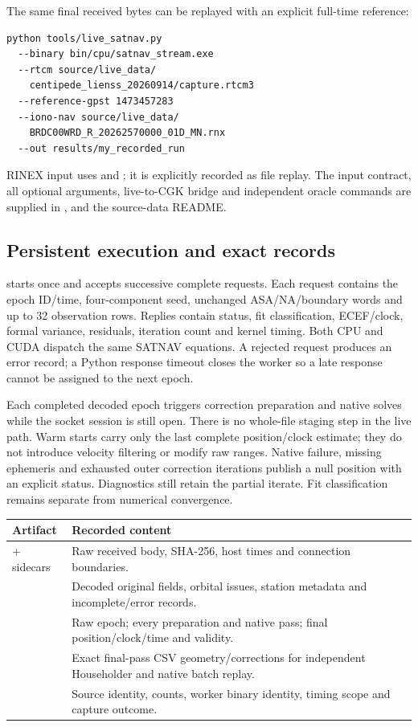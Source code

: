 The same final received bytes can be replayed with an explicit full-time reference:
\begin{lstlisting}
python tools/live_satnav.py
  --binary bin/cpu/satnav_stream.exe
  --rtcm source/live_data/
    centipede_lienss_20260914/capture.rtcm3
  --reference-gpst 1473457283
  --iono-nav source/live_data/
    BRDC00WRD_R_20262570000_01D_MN.rnx
  --out results/my_recorded_run
\end{lstlisting}
RINEX input uses  and ; it is explicitly recorded
as file replay. The input contract, all optional arguments, live-to-CGK bridge
and independent oracle commands are supplied in ,
 and the source-data README.



\subsection{Persistent execution and exact records}
 starts once and accepts successive complete requests. Each
request contains the epoch ID/time, four-component seed, unchanged ASA/NA/boundary
words and up to 32 observation rows. Replies contain status, fit classification,
ECEF/clock, formal variance, residuals, iteration count and kernel timing. Both
CPU and CUDA dispatch the same SATNAV equations. A rejected request produces an
error record; a Python response timeout closes the worker so a late response
cannot be assigned to the next epoch.

Each completed decoded epoch triggers correction preparation and native solves
while the socket session is still open. There is no whole-file staging step in
the live path. Warm starts carry only the last complete position/clock estimate;
they do not introduce velocity filtering or modify raw ranges. Native failure,
missing ephemeris and exhausted outer correction iterations publish a null
position with an explicit status. Diagnostics still retain the partial iterate.
Fit classification remains separate from numerical convergence.

\begin{center}
\begin{tabularx}{\textwidth}{@{}P{.35\textwidth}Y@{}}\toprule
\textbf{Artifact} & \textbf{Recorded content}\\\midrule
{} + sidecars & Raw received body, SHA-256, host times and connection boundaries.\\
 & Decoded original fields, orbital issues, station metadata and incomplete/error records.\\
 & Raw epoch; every preparation and native pass; final position/clock/time and validity.\\
 & Exact final-pass CSV geometry/corrections for independent Householder and native batch replay.\\
 & Source identity, counts, worker binary identity, timing scope and capture outcome.\\\bottomrule
\end{tabularx}
\end{center}

